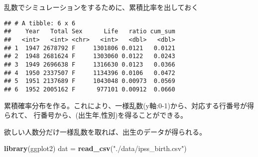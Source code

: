 \documentclass[
]{book}
\newenvironment{Shaded}{\begin{snugshade}}{\end{snugshade}}
\newcommand{\DataTypeTok}[1]{\textcolor[rgb]{0.13,0.29,0.53}{#1}}
\newcommand{\KeywordTok}[1]{\textcolor[rgb]{0.13,0.29,0.53}{\textbf{#1}}}
\newcommand{\NormalTok}[1]{#1}
\newcommand{\OperatorTok}[1]{\textcolor[rgb]{0.81,0.36,0.00}{\textbf{#1}}}
\newcommand{\OtherTok}[1]{\textcolor[rgb]{0.56,0.35,0.01}{#1}}
\newcommand{\StringTok}[1]{\textcolor[rgb]{0.31,0.60,0.02}{#1}}
\begin{document}
乱数でシミュレーションをするために、累積比率を出しておく

\begin{Shaded}
\end{Shaded}

\begin{verbatim}
## # A tibble: 6 x 6
##    Year   Total Sex      Life   ratio cum_sum
##   <int>   <int> <chr>   <int>   <dbl>   <dbl>
## 1  1947 2678792 F     1301806 0.0121   0.0121
## 2  1948 2681624 F     1303060 0.0122   0.0243
## 3  1949 2696638 F     1316630 0.0123   0.0366
## 4  1950 2337507 F     1134396 0.0106   0.0472
## 5  1951 2137689 F     1043048 0.00973  0.0569
## 6  1952 2005162 F      977101 0.00912  0.0660
\end{verbatim}

\begin{Shaded}
\end{Shaded}

累積確率分布を作る。これにより、一様乱数(y軸:0-1)から、対応する行番号が得られて、
行番号から、(出生年,性別)を得ることができる。

欲しい人数分だけ一様乱数を取れば、出生のデータが得られる。

\begin{Shaded}
\begin{Highlighting}[]
\KeywordTok{library}\NormalTok{(ggplot2)}
\NormalTok{dat =}\StringTok{ }\KeywordTok{read_csv}\NormalTok{(}\StringTok{"./data/ipss_birth.csv"}\NormalTok{)}
\end{Highlighting}
\end{Shaded}
\end{document}
